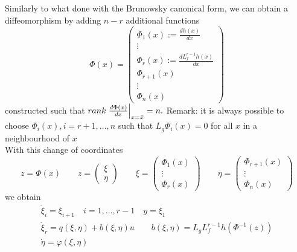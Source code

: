 \documentclass[english]{lectures}
\begin{document}
Similarly to what done with the Brunowsky canonical form, we can obtain a diffeomorphism by adding $n-r$ additional functions
\[
    \Phi(x)=\begin{pmatrix}
        \Phi_1(x):=\frac{dh(x)}{dx}\\\vdots\\\Phi_r(x):=\frac{dL_f^{r-1}h(x)}{dx}\\ \Phi_{r+1}(x)\\\vdots\\\Phi_n(x)
    \end{pmatrix}
\]
constructed such that $rank\eval{\frac{d\Phi(x)}{dx}}_{x=\bar{x}}=n.$
Remark: it is always possible to choose $\Phi_i(x),i=r+1,\dots,n$ such that $L_g\Phi_i(x)=0$ for all $x$ in a neighbourhood of $x$\\
With this change of coordinates
\[
    z=\Phi(x)\qquad z=\begin{pmatrix}
        \xi\\\eta
    \end{pmatrix} \qquad \xi=\begin{pmatrix}
        \Phi_1(x) \\ \vdots \\ \Phi_r(x)
    \end{pmatrix} \qquad \eta=\begin{pmatrix}
        \Phi_{r+1}(x) \\ \vdots \\ \Phi_n(x)
    \end{pmatrix}
\]
we obtain
\begin{gather*}
    \dot{\xi}_i=\xi_{i+1} \quad i=1,\dots,r-1 \quad y=\xi_1\\
    \dot{\xi}_r=q(\xi,\eta)+b(\xi,\eta)u \qquad b(\xi,\eta)=L_gL_f^{r-1}h(\Phi^{-1}(z))\\
    \dot{\eta}=\varphi(\xi,\eta)
\end{gather*}
\end{document}
